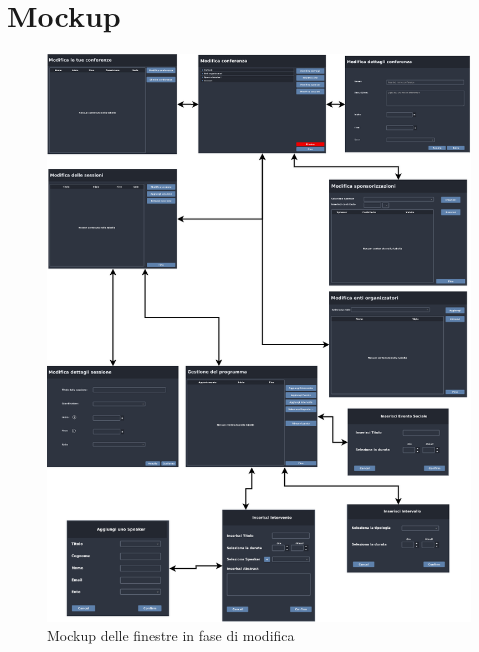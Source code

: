 \newpage
\section{Mockup}

\begin{figure}
	\centering
	\includegraphics[scale=0.5]{Immagini/Mockup/Edit/Flow_Edit.png}
	\caption{Mockup delle finestre in fase di modifica}
\end{figure}

